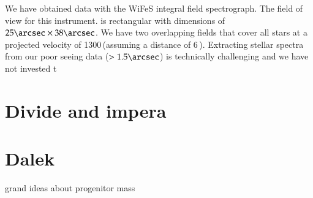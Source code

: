 We have obtained data with the WiFeS integral field spectrograph. The field of view for this instrument. is rectangular with dimensions of $25\arcsec \times 38\arcsec$. We have two overlapping fields that cover all stars at a projected velocity of 1300\,\kms (assuming a distance of 6\,\kpc). Extracting stellar spectra from our poor seeing data ($> 1.5\arcsec$) is technically challenging and we have not invested t


\section{Divide and impera}

\section{Dalek}





grand ideas about progenitor mass
